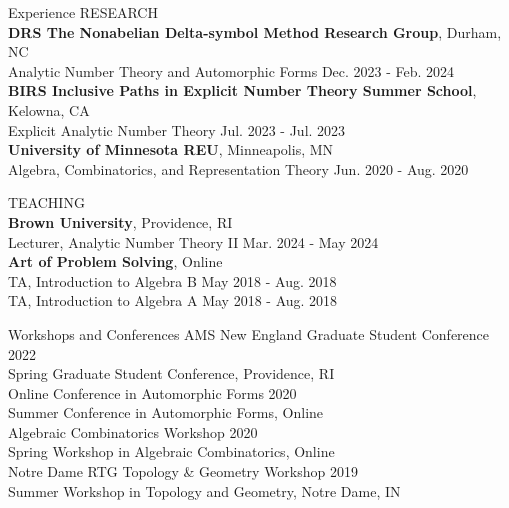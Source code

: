 \documentclass{resume} %
\begin{document}
\begin{rSection}{Experience}
    RESEARCH \\
    {\bf DRS The Nonabelian Delta-symbol Method Research Group}, Durham, NC \\
    \hphantom{\quad} Analytic Number Theory and Automorphic Forms \hfill {Dec. 2023 - Feb. 2024} \\
    {\bf BIRS Inclusive Paths in Explicit Number Theory Summer School}, Kelowna, CA \\
    \hphantom{\quad} Explicit Analytic Number Theory \hfill {Jul. 2023 - Jul. 2023} \\
    {\bf University of Minnesota REU}, Minneapolis, MN \\
    \hphantom{\quad} Algebra, Combinatorics, and Representation Theory \hfill {Jun. 2020 - Aug. 2020}

    TEACHING \\
    {\bf Brown University}, Providence, RI \\
    \hphantom{\quad} Lecturer, Analytic Number Theory II \hfill {Mar. 2024 - May 2024} \\
    {\bf Art of Problem Solving}, Online \\
    \hphantom{\quad} TA, Introduction to Algebra B \hfill {May 2018 - Aug. 2018} \\
    \hphantom{\quad} TA, Introduction to Algebra A \hfill {May 2018 - Aug. 2018} \\
\end{rSection}

\begin{rSection}{Workshops and Conferences}
    {AMS New England Graduate Student Conference} \hfill {2022} \\
    \hphantom{\quad}Spring Graduate Student Conference, Providence, RI \\
    {Online Conference in Automorphic Forms} \hfill {2020} \\
    \hphantom{\quad}Summer Conference in Automorphic Forms, Online \\
    {Algebraic Combinatorics Workshop} \hfill {2020} \\
    \hphantom{\quad}Spring Workshop in Algebraic Combinatorics, Online \\
    {Notre Dame RTG Topology \& Geometry Workshop} \hfill {2019} \\
    \hphantom{\quad}Summer Workshop in Topology and Geometry, Notre Dame, IN
\end{rSection}
\end{document}
